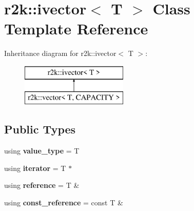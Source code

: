 \hypertarget{classr2k_1_1ivector}{}\section{r2k\+::ivector$<$ T $>$ Class Template Reference}
\label{classr2k_1_1ivector}
Inheritance diagram for r2k\+::ivector$<$ T $>$\+:\begin{figure}[H]
\begin{center}
\leavevmode
\includegraphics[height=2.000000cm]{classr2k_1_1ivector}
\end{center}
\end{figure}
\subsection*{Public Types}
\begin{DoxyCompactItemize}
\item 
\mbox{\label{classr2k_1_1ivector_a3a4a70de708c8da5839e8ee768c98b5f}} 
using {\bfseries value\+\_\+type} = T
\item 
\mbox{\label{classr2k_1_1ivector_ace2102b41173217afd12cea873393cf2}} 
using {\bfseries iterator} = T $\ast$
\item 
\mbox{\label{classr2k_1_1ivector_a516031d9abc36627e05a7291819ae73b}} 
using {\bfseries reference} = T \&
\item 
\mbox{\label{classr2k_1_1ivector_ad2d0d8eec97c5e73db7afcb5dc3d444a}} 
using {\bfseries const\+\_\+reference} = const T \&
\end{DoxyCompactItemize}
